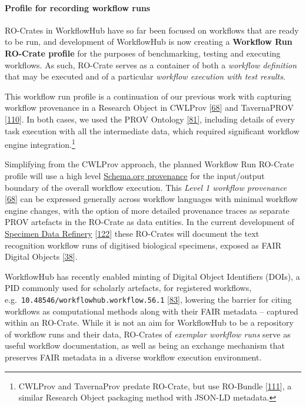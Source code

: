 \hypertarget{profile-for-recording-workflow-runs}{%
\paragraph{Profile for recording workflow
runs}\label{profile-for-recording-workflow-runs}}

RO-Crates in WorkflowHub have so far been focused on workflows that are
ready to be run, and development of WorkflowHub is now creating a
\textbf{Workflow Run RO-Crate profile} for the purposes of benchmarking,
testing and executing workflows. As such, RO-Crate serves as a container
of both a \emph{workflow definition} that may be executed and of a
particular \emph{workflow execution with test results}.

This workflow run profile is a continuation of our previous work with
capturing workflow provenance in a Research Object in CWLProv
{[}\href{https://doi.org/10.1093/gigascience/giz095}{68}{]} and
TavernaPROV {[}\href{https://s11.no/2016/provweek-tavernaprov/}{110}{]}.
In both cases, we used the PROV Ontology
\href{https://www.w3.org/TR/2013/REC-prov-o-20130430/}{{[}81{]}},
including details of every task execution with all the intermediate
data, which required significant workflow engine integration.\footnote{CWLProv
  and TavernaProv predate RO-Crate, but use RO-Bundle
  {[}\href{https://w3id.org/bundle/2014-11-05/}{111}{]}, a similar
  Research Object packaging method with JSON-LD metadata.}

Simplifying from the CWLProv approach, the planned Workflow Run RO-Crate
profile will use a high level
\href{https://www.researchobject.org/ro-crate/1.1/provenance.html\#software-used-to-create-files}{Schema.org
provenance} for the input/output boundary of the overall workflow
execution. This \emph{Level 1 workflow provenance}
{[}\href{https://doi.org/10.1093/gigascience/giz095}{68}{]} can be
expressed generally across workflow languages with minimal workflow
engine changes, with the option of more detailed provenance traces as
separate PROV artefacts in the RO-Crate as data entities. In the current
development of \href{https://github.com/DiSSCo/SDR}{Specimen Data
Refinery} {[}\href{https://doi.org/10.3897/rio.6.e57602}{122}{]} these
RO-Crates will document the text recognition workflow runs of digitised
biological specimens, exposed as FAIR Digital Objects
{[}\href{https://doi.org/10.3390/publications8020021}{38}{]}.

WorkflowHub has recently enabled minting of Digital Object Identifiers
(DOIs), a PID commonly used for scholarly artefacts, for registered
workflows, e.g.~\texttt{10.48546/workflowhub.workflow.56.1}
{[}\href{https://doi.org/10.48546/workflowhub.workflow.56.1}{83}{]},
lowering the barrier for citing workflows as computational methods along
with their FAIR metadata -- captured within an RO-Crate. While it is not
an aim for WorkflowHub to be a repository of workflow runs and their
data, RO-Crates of \emph{exemplar workflow runs} serve as useful
workflow documentation, as well as being an exchange mechanism that
preserves FAIR metadata in a diverse workflow execution environment.

